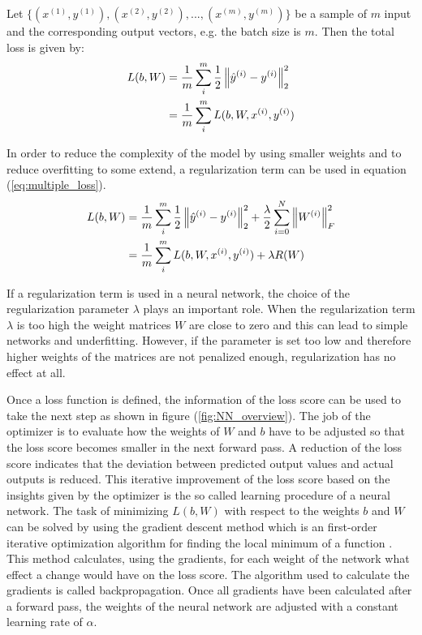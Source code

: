 \begin{definition}\label{def:batch_loss}
	Let $\{(x^{(1)}, y^{(1)}), (x^{(2)}, y^{(2)}), ..., (x^{(m)}, y^{(m)})\}$ be a sample of $m$ input and the corresponding output vectors, e.g. the batch size is $m$. Then the total loss is given by:	
	\begin{equation}\label{eq:multiple_loss}
	\begin{aligned}
	L(b, W) &= \frac{1}{m} \sum_i^m \frac{1}{2} \left\lVert\hat{y}^{(i)} - y^{(i)}\right\rVert^2_2 \\
			&= \frac{1}{m} \sum_i^m L(b, W, x^{(i)}, y^{(i)})
	\end{aligned}
	\end{equation}
\end{definition}

\begin{remark} \label{rem:regularization}
	In order to reduce the complexity of the model by using smaller weights and to reduce overfitting to some extend, a regularization term can be used in equation (\ref{eq:multiple_loss}).
	\begin{equation}\label{eq:multiple_loss_regularization}
	\begin{aligned}
	L(b, W) &= \frac{1}{m} \sum_i^m \frac{1}{2} \left\lVert\hat{y}^{(i)} - y^{(i)}\right\rVert^2_2 + \frac{\lambda}{2} \sum_{i=0}^{N} \left\lVert W^{(i)}\right\rVert_F^2\\
	&= \frac{1}{m} \sum_i^m L(b, W, x^{(i)}, y^{(i)}) + \lambda R(W)
	\end{aligned}
	\end{equation}
\end{remark}

If a regularization term is used in a neural network, the choice of the regularization parameter $\lambda$ plays an important role. When the regularization term $\lambda$ is too high the weight matrices $W$ are close to zero and this can lead to simple networks and underfitting. However, if the parameter is set too low and therefore higher weights of the matrices are not penalized enough, regularization has no effect at all.

Once a loss function is defined, the information of the loss score can be used to take the next step as shown in figure (\ref{fig:NN_overview}). The job of the optimizer is to evaluate how the weights of $W$ and $b$ have to be adjusted so that the loss score becomes smaller in the next forward pass. A reduction of the loss score indicates that the deviation between predicted output values and actual outputs is reduced. This iterative improvement of the loss score based on the insights given by the optimizer is the so called learning procedure of a neural network. The task of minimizing $L(b, W)$ with respect to the weights $b$ and $W$ can be solved by using the gradient descent method which is an  first-order iterative optimization algorithm for finding the local minimum of a function \cite{gradient_desc}. This method calculates, using the gradients, for each weight of the network what effect a change would have on the loss score. The algorithm used to calculate the gradients is called backpropagation.  Once all gradients have been calculated after a forward pass, the weights of the neural network are adjusted with a constant learning rate of $\alpha$. 



